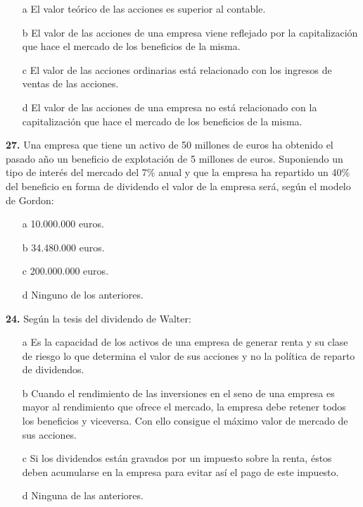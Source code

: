 \documentclass{nuevotema}
\begin{document}
\begin{enumerate}
	\item[a] El valor teórico de las acciones es superior al contable.
	\item[b] El valor de las acciones de una empresa viene reflejado por la capitalización que hace el mercado de los beneficios de la misma.
	\item[c] El valor de las acciones ordinarias está relacionado con los ingresos de ventas de las acciones.
	\item[d] El valor de las acciones de una empresa no está relacionado con la capitalización que hace el mercado de los beneficios de la misma.
\end{enumerate}

\textbf{27.} Una empresa que tiene un activo de 50 millones de euros ha obtenido el pasado año un beneficio de explotación de 5 millones de euros. Suponiendo un tipo de interés del mercado del 7\% anual y que la empresa ha repartido un 40\% del beneficio en forma de dividendo el valor de la empresa será, según el modelo de Gordon:
\begin{enumerate}
	\item[a] 10.000.000 euros.
	\item[b] 34.480.000 euros.
	\item[c] 200.000.000 euros.
	\item[d] Ninguno de los anteriores.
\end{enumerate}

\textbf{24.} Según la tesis del dividendo de Walter:

\begin{enumerate}
	\item[a] Es la capacidad de los activos de una empresa de generar renta y su clase de riesgo lo que determina el valor de sus acciones y no la política de reparto de dividendos.
	\item[b] Cuando el rendimiento de las inversiones en el seno de una empresa es mayor al rendimiento que ofrece el mercado, la empresa debe retener todos los beneficios y viceversa. Con ello consigue el máximo valor de mercado de sus acciones.
	\item[c] Si los dividendos están gravados por un impuesto sobre la renta, éstos deben acumularse en la empresa para evitar así el pago de este impuesto.
	\item[d] Ninguna de las anteriores.
\end{enumerate}
\end{document}
